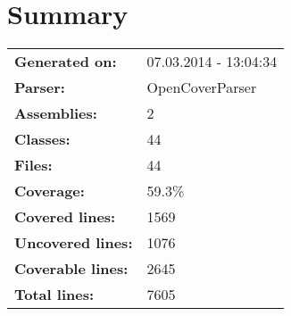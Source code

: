 \documentclass[a4paper,10pt]{article}
\begin{document}
\setcounter{secnumdepth}{-1}
\section{Summary}
\begin{longtable}[l]{ll}
\textbf{Generated on:} & 07.03.2014 - 13:04:34\\
\textbf{Parser:} & OpenCoverParser\\
\textbf{Assemblies:} & 2\\
\textbf{Classes:} & 44\\
\textbf{Files:} & 44\\
\textbf{Coverage:} & 59.3\%\\
\textbf{Covered lines:} & 1569\\
\textbf{Uncovered lines:} & 1076\\
\textbf{Coverable lines:} & 2645\\
\textbf{Total lines:} & 7605\\
\end{longtable}
\end{document}
